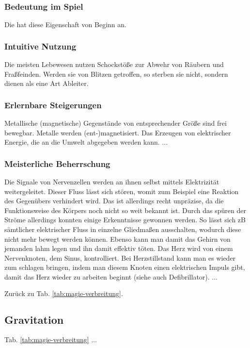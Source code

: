 \subsubsection{Bedeutung im Spiel}
Die  hat diese Eigenschaft von Beginn an. 

\subsubsection{Intuitive Nutzung}
Die meisten Lebewesen nutzen Schockstöße zur Abwehr von Räubern und Fraßfeinden. Werden sie von Blitzen getroffen, so sterben sie nicht, sondern dienen als eine Art Ableiter. 

\subsubsection{Erlernbare Steigerungen}
\begin{outline}
	\1 Metallische (magnetische) Gegenstände von entsprechender Größe sind frei bewegbar.
	\1 Metalle werden (ent-)magnetisiert.
	\1 Das Erzeugen von elektrischer Energie, die an die Umwelt abgegeben werden kann.
	\1 ...
\end{outline}

\subsubsection{Meisterliche Beherrschung} 
\begin{outline}
	\1 Die Signale von Nervenzellen werden an ihnen selbst mittels Elektrizität weitergeleitet. Dieser Fluss lässt sich stören, womit zum Beispiel eine Reaktion des Gegenübers verhindert wird. Das ist allerdings recht unpräzise, da die Funktionsweise des Körpers noch nicht so weit bekannt ist. Durch das spüren der Ströme allerdings konnten einige Erkenntnisse gewonnen werden. So lässt sich zB sämtlicher elektrischer Fluss in einzelne Gliedmaßen ausschalten, wodurch diese nicht mehr bewegt werden können.
	\1 Ebenso kann man damit das Gehirn von jemanden lahm legen und ihn damit effektiv töten.
	\1 Das Herz wird von einem Nervenknoten, dem Sinus, kontrolliert. Bei Herzstillstand kann man es wieder zum schlagen bringen, indem man diesem Knoten einen elektrischen Impuls gibt, damit das Herz wieder zu arbeiten beginnt (siehe auch Defibrillator).
	\1 ...
\end{outline}
Zurück zu Tab. \ref{tab:magie-verbreitung}.



\subsection{Gravitation}\label{sec:gravitationsmagie} Tab. \ref{tab:magie-verbreitung} %
...

